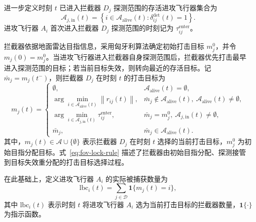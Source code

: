 进一步定义时刻 $t$ 已进入拦截器 $D_j$ 探测范围的存活进攻飞行器集合为
\begin{equation}
\mathcal A_{j,\mathrm{in}}(t)
=
\left\{
i\in\mathcal A_{\mathrm{alive}}(t):
\delta_{ij}^{\mathrm{det}}(t)=1
\right\}.
\label{eq:in-detect-set}
\end{equation}
进攻飞行器 $A_i$ 首次进入拦截器 $D_j$ 探测范围的时刻记为 $\tau_{ij}^{\mathrm{enter}}$。

拦截器依据地面雷达目指信息，采用匈牙利算法确定初始打击目标 $m_j^0$，并令 $m_j(0)=m_j^0$。当进攻飞行器进入拦截器自身探测范围后，拦截器优先打击最早进入探测范围的目标；若当前目标失效，则转向最近的存活目标。记 $\bar m_j=m_j(t^-)$，则拦截器 $D_j$ 在时刻 $t$ 的打击目标为
\begin{equation}
m_j(t)=
\begin{cases}
\emptyset,
& \mathcal A_{\mathrm{alive}}(t)=\emptyset,\\[1mm]
\displaystyle \arg\min_{i\in \mathcal A_{\mathrm{alive}}(t)}
\left\|r_{ij}(t)\right\|,
& \bar m_j\notin \mathcal A_{\mathrm{alive}}(t),\
\mathcal A_{\mathrm{alive}}(t)\neq\emptyset,\\[3mm]
\displaystyle \arg\min_{i\in \mathcal A_{j,\mathrm{in}}(t)}
\tau_{ij}^{\mathrm{enter}},
& \bar m_j=m_j^0,\
\mathcal A_{j,\mathrm{in}}(t)\neq\emptyset,\\[3mm]
\bar m_j,
& \bar m_j\in \mathcal A_{\mathrm{alive}}(t).
\end{cases}
\label{eq:fov-lock-rule}
\end{equation}
其中，$m_j(t)\in\mathcal A\cup\{\emptyset\}$ 表示拦截器 $D_j$ 在时刻 $t$ 选择的当前打击目标，$m_j^0$ 为初始目指分配目标。式~\eqref{eq:fov-lock-rule} 描述了拦截器由初始目指分配、探测接管到目标失效重分配的打击目标选择过程。


在此基础上，定义进攻飞行器 $A_i$ 的实际被捕获数量为
\begin{equation}
\mathrm{lbc}_i(t)
=
\sum_{j\in\mathcal D}
\mathbf{1}\bigl\{m_j(t)=i\bigr\},
\label{eq:lbc-def}
\end{equation}
其中 $\mathrm{lbc}_i(t)$ 表示时刻 $t$ 将进攻飞行器 $A_i$ 选为当前打击目标的拦截器数量，$\mathbf{1}\{\cdot\}$ 为指示函数。

